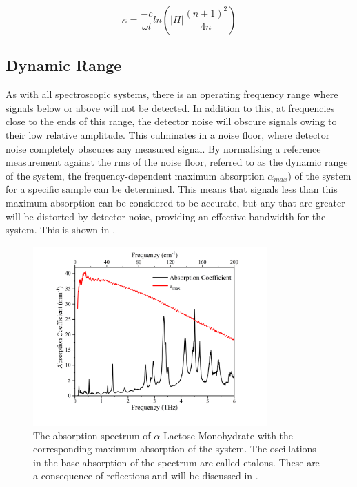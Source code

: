 \begin{equation}
\kappa = \frac{-c}{\omega l} ln\left(|H|\frac{(n+1)^2}{4n}\right)
\end{equation}

\subsection{Dynamic Range}
As with all spectroscopic systems, there is an operating frequency range where signals below or above will not be detected. In addition to this, at frequencies close to the ends of this range, the detector noise will obscure signals owing to their low relative amplitude. This culminates in a noise floor, where detector noise completely obscures any measured signal. By normalising a reference measurement against the \acrfull{rms} of the noise floor, referred to as the dynamic range of the system, the frequency\nobreakdash-dependent maximum absorption \(\alpha_{max}\)) of the system for a specific sample can be determined. This means that signals less than this maximum absorption can be considered to be accurate, but any that are greater will be distorted by detector noise, providing an effective bandwidth for the system. This is shown in .

\begin{figure}
    \centering
    \includegraphics[width=0.8\textwidth]{Figures/Spectra/AbsCoGNeat.png}
    \captionsetup{font = footnotesize, justification = centering}
    \caption[The Absorption Spectrum of \(\alpha\)-Lactose Monohydrate with the corresponding Maximum Absorption of the System]{The absorption spectrum of \(\alpha\)-Lactose Monohydrate with the corresponding maximum absorption of the system. The oscillations in the base absorption of the spectrum are called etalons. These are a consequence of reflections and will be discussed in .}
    \label{fig:my_absconeat}
\end{figure}

